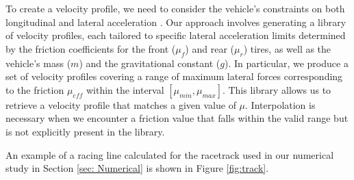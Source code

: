 To create a velocity profile, we need to consider the vehicle's constraints on both longitudinal and lateral acceleration \cite{doi:10.1080/00423114.2019.1631455}. Our approach involves generating a library of velocity profiles, each tailored to specific lateral acceleration limits determined by the friction coefficients for the front ($\mu_f$) and rear ($\mu_r$) tires, as well as the vehicle's mass ($m$) and the gravitational constant ($g$). In particular, we produce a set of velocity profiles covering a range of maximum lateral forces corresponding to the friction $\mu_{eff}$ within the interval $[\mu_{min}, \mu_{max}]$. This library allows us to retrieve a velocity profile that matches a given value of $\mu$. Interpolation is necessary when we encounter a friction value that falls within the valid range but is not explicitly present in the library.

An example of a racing line calculated for the racetrack used in our numerical study in Section \ref{sec: Numerical} is shown in Figure \ref{fig:track}. 


